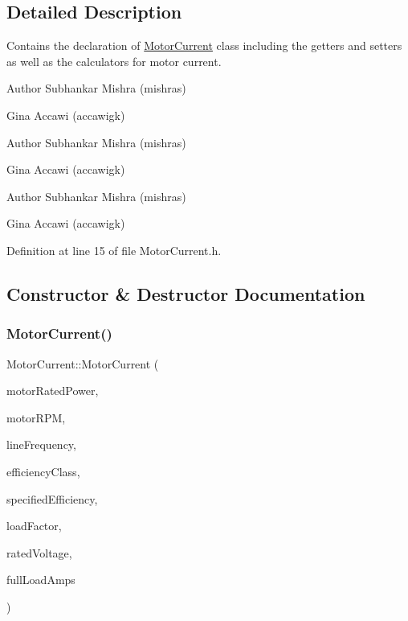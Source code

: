 \subsection{Detailed Description}
Contains the declaration of \hyperlink{class_motor_current}{Motor\+Current} class including the getters and setters as well as the calculators for motor current. 

\begin{DoxyAuthor}{Author}
Subhankar Mishra (mishras) 

Gina Accawi (accawigk) 
\end{DoxyAuthor}


\begin{DoxyAuthor}{Author}
Subhankar Mishra (mishras) 

Gina Accawi (accawigk) 
\end{DoxyAuthor}


\begin{DoxyAuthor}{Author}
Subhankar Mishra (mishras) 

Gina Accawi (accawigk) 
\end{DoxyAuthor}


Definition at line 15 of file Motor\+Current.\+h.



\subsection{Constructor \& Destructor Documentation}
\mbox{\label{class_motor_current_a099860ac4021ce07ec5b033b3bcf37e4}} 
\subsubsection{\texorpdfstring{Motor\+Current()}{MotorCurrent()}\hspace{0.1cm}{\footnotesize\ttfamily [1/3]}}
{\footnotesize\ttfamily Motor\+Current\+::\+Motor\+Current (\begin{DoxyParamCaption}\item[{double}]{motor\+Rated\+Power,  }\item[{double}]{motor\+R\+PM,  }\item[{\hyperlink{class_motor_acee1bdf1b684ad36cb80dc2829d9fcee}{Motor\+::\+Line\+Frequency}}]{line\+Frequency,  }\item[{\hyperlink{class_motor_afa022971ae062406a9f588c601673d4e}{Motor\+::\+Efficiency\+Class}}]{efficiency\+Class,  }\item[{double}]{specified\+Efficiency,  }\item[{double}]{load\+Factor,  }\item[{double}]{rated\+Voltage,  }\item[{double}]{full\+Load\+Amps }\end{DoxyParamCaption})\hspace{0.3cm}{\ttfamily [inline]}}

